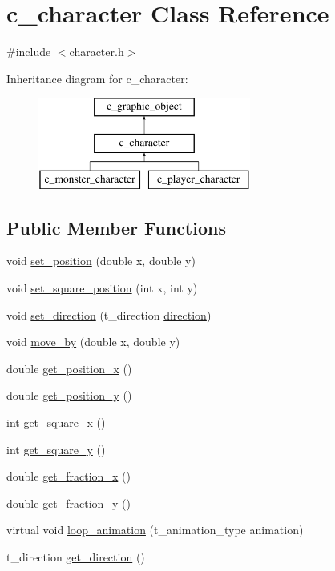 \hypertarget{classc__character}{\section{c\-\_\-character Class Reference}
\label{classc__character}
}


{\ttfamily \#include $<$character.\-h$>$}

Inheritance diagram for c\-\_\-character\-:\begin{figure}[H]
\begin{center}
\leavevmode
\includegraphics[height=3.000000cm]{classc__character}
\end{center}
\end{figure}
\subsection*{Public Member Functions}
\begin{DoxyCompactItemize}
\item 
void \hyperlink{classc__character_a75c54e9c7283064a4064c6f369d4f45e}{set\-\_\-position} (double x, double y)
\item 
void \hyperlink{classc__character_ace2ad2a0175d52648347a01446d7cc75}{set\-\_\-square\-\_\-position} (int x, int y)
\item 
void \hyperlink{classc__character_a21828380cb11fded91a99dbbc9df9848}{set\-\_\-direction} (t\-\_\-direction \hyperlink{classc__character_a571f1ae6115d7e9fee3159c41fcf27e8}{direction})
\item 
void \hyperlink{classc__character_a4379e618f98e6be9cdf74c4cb723cd4e}{move\-\_\-by} (double x, double y)
\item 
double \hyperlink{classc__character_a74dead1895f81f7e40dc854edcf66ea7}{get\-\_\-position\-\_\-x} ()
\item 
double \hyperlink{classc__character_a1998f04f49c42ca29acb2decdcdcab31}{get\-\_\-position\-\_\-y} ()
\item 
int \hyperlink{classc__character_a00780360179b7b58334bbae046c0a6e6}{get\-\_\-square\-\_\-x} ()
\item 
int \hyperlink{classc__character_ac99f93abd4f6a9dc436ca96a4ff3f856}{get\-\_\-square\-\_\-y} ()
\item 
double \hyperlink{classc__character_a5ffab5363aa4f8661d6c59ccc4e82038}{get\-\_\-fraction\-\_\-x} ()
\item 
double \hyperlink{classc__character_aa2efb20e603bfe0a5b3e63c3ffc86719}{get\-\_\-fraction\-\_\-y} ()
\item 
virtual void \hyperlink{classc__character_a323dd6b7cf6635a0b61e4351178d7518}{loop\-\_\-animation} (t\-\_\-animation\-\_\-type animation)
\item 
t\-\_\-direction \hyperlink{classc__character_af5421aaa7b9ddb2b17e7994419f93c42}{get\-\_\-direction} ()
\end{DoxyCompactItemize}
